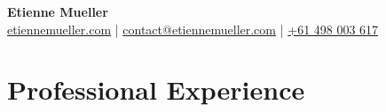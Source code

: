 \documentclass[a4paper,11pt]{article}
\begin{document}
\begin{center}
    \textbf{\Huge Etienne Mueller} \\ 
    \vspace{12pt}
    \small
    \faHome \hspace{.5pt} 
    \href{https://www.etiennemueller.com}{etiennemueller.com} |
    \faEnvelope \hspace{.5pt} 
    \href{mailto:contact@etiennemueller.com}{contact@etiennemueller.com} |
    \faPhone \hspace{.5pt} 
    \href{tel:+61498003617}{+61 498 003 617}
\end{center}



\section{Professional Experience}
\end{document}
